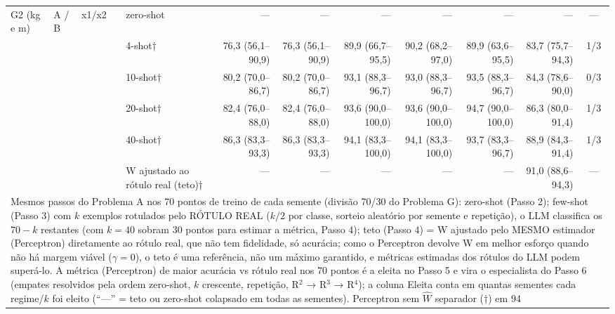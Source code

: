 \begin{table}[htbp]
\begin{tabular}{llllrrrrrrc}
\midrule
G2 (kg e m) & A / B & x1/x2 & zero-shot & — & — & — & — & — & — & — \\
 &  &  & 4-shot† & 76,3 (56,1–90,9) & 76,3 (56,1–90,9) & 89,9 (66,7–95,5) & 90,2 (68,2–97,0) & 89,9 (63,6–95,5) & 83,7 (75,7–94,3) & 1/3 \\
 &  &  & 10-shot† & 80,2 (70,0–86,7) & 80,2 (70,0–86,7) & 93,1 (88,3–96,7) & 93,0 (88,3–96,7) & 93,5 (88,3–96,7) & 84,3 (78,6–90,0) & 0/3 \\
 &  &  & 20-shot† & 82,4 (76,0–88,0) & 82,4 (76,0–88,0) & 93,6 (90,0–100,0) & 93,6 (90,0–100,0) & 94,7 (90,0–100,0) & 86,3 (80,0–91,4) & 1/3 \\
 &  &  & 40-shot† & 86,3 (83,3–93,3) & 86,3 (83,3–93,3) & 94,1 (83,3–100,0) & 94,1 (83,3–100,0) & 93,7 (83,3–96,7) & 88,9 (84,3–91,4) & 1/3 \\
 &  &  & W ajustado ao rótulo real (teto)† & — & — & — & — & — & 91,0 (88,6–94,3) & — \\
\bottomrule
\multicolumn{11}{p{0.95\linewidth}}{\footnotesize Mesmos passos do Problema A nos 70 pontos de treino de cada semente (divisão 70/30 do Problema G): zero-shot (Passo 2); few-shot (Passo 3) com $k$ exemplos rotulados pelo RÓTULO REAL ($k/2$ por classe, sorteio aleatório por semente e repetição), o LLM classifica os $70-k$ restantes (com $k = 40$ sobram 30 pontos para estimar a métrica, Passo 4); teto (Passo 4) = W ajustado pelo MESMO estimador (Perceptron) diretamente ao rótulo real, que não tem fidelidade, só acurácia; como o Perceptron devolve W em melhor esforço quando não há margem viável ($\gamma = 0$), o teto é uma referência, não um máximo garantido, e métricas estimadas dos rótulos do LLM podem superá-lo. A métrica (Perceptron) de maior acurácia vs rótulo real nos 70 pontos é a eleita no Passo 5 e vira o especialista do Passo 6 (empates resolvidos pela ordem zero-shot, $k$ crescente, repetição, R$^2$ → R$^3$ → R$^4$); a coluna Eleita conta em quantas sementes cada regime/$k$ foi eleito (``—'' = teto ou zero-shot colapsado em todas as sementes). Perceptron sem $\hat{W}$ separador (†) em 94%
}
\end{tabular}
\end{table}
